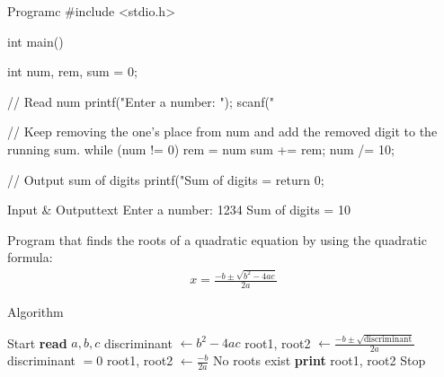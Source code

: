 \documentclass[11pt]{ipu-c}
\begin{document}
    \newpage
    \begin{code}
        {Program}{c}
#include <stdio.h>

int main() {
    int num, rem, sum = 0;

    // Read num
    printf("Enter a number: ");
    scanf("%

    // Keep removing the one's place from num and add the removed digit to the running sum.
    while (num != 0) {
        rem = num %
        sum += rem;
        num /= 10;
    }

    // Output sum of digits
    printf("Sum of digits = %
    return 0;
}
    \end{code}
    \begin{code}
        {Input \& Output}{text}
Enter a number: 1234
Sum of digits = 10
    \end{code}


    {Program that finds the roots of a quadratic equation by using the quadratic formula:\vspace*{-5pt}%
        \begin{align*}%
            x = \frac{-b \pm \sqrt{b^2 - 4ac}}{2a}
        \end{align*}\vspace*{-25pt}}

    \begin{tabularsection}{Algorithm}
        \begin{algorithmic}[1]
            \State Start
            \State \textbf{read} $a, b, c$
            \State discriminant $\gets b^2 - 4ac$
                \State root1, root2 $\gets \frac{-b \pm \sqrt{\text{discriminant}}}{2a}$
            \ElsIf
                    {discriminant $= 0$}
                \State root1, root2 $\gets \frac{-b}{2a}$
            \Else
                \State No roots exist
            \EndIf
            \State \textbf{print} root1, root2
            \State Stop
        \end{algorithmic}
    \end{tabularsection}
\end{document}
